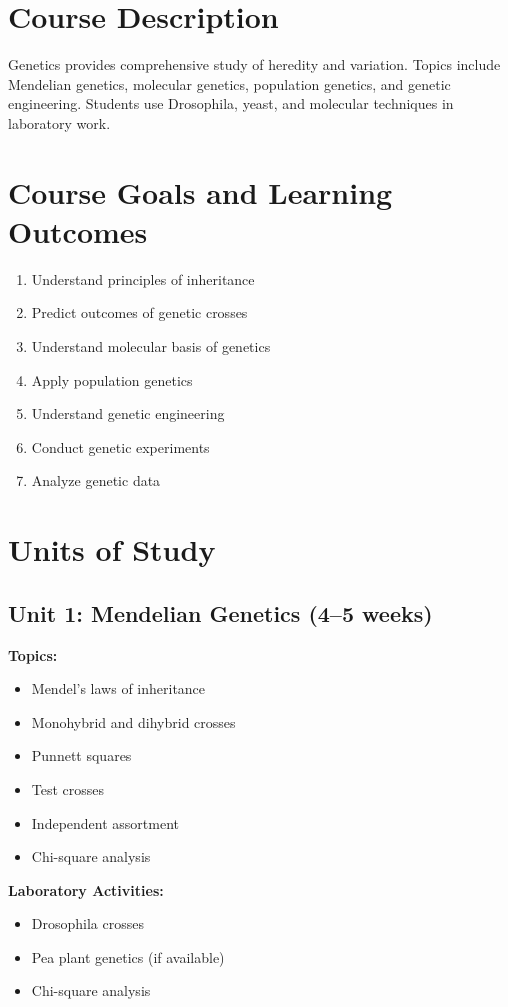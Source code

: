 \documentclass[12pt,oneside]{book}
\begin{document}
\section{Course Description}

Genetics provides comprehensive study of heredity and variation. Topics include Mendelian genetics, molecular genetics, population genetics, and genetic engineering. Students use Drosophila, yeast, and molecular techniques in laboratory work.

\section{Course Goals and Learning Outcomes}

\begin{enumerate}
    \item Understand principles of inheritance
    \item Predict outcomes of genetic crosses
    \item Understand molecular basis of genetics
    \item Apply population genetics
    \item Understand genetic engineering
    \item Conduct genetic experiments
    \item Analyze genetic data
\end{enumerate}

\section{Units of Study}

\subsection{Unit 1: Mendelian Genetics (4--5 weeks)}

\textbf{Topics:}
\begin{itemize}
    \item Mendel's laws of inheritance
    \item Monohybrid and dihybrid crosses
    \item Punnett squares
    \item Test crosses
    \item Independent assortment
    \item Chi-square analysis
\end{itemize}

\textbf{Laboratory Activities:}
\begin{itemize}
    \item Drosophila crosses
    \item Pea plant genetics (if available)
    \item Chi-square analysis
\end{itemize}
\end{document}
